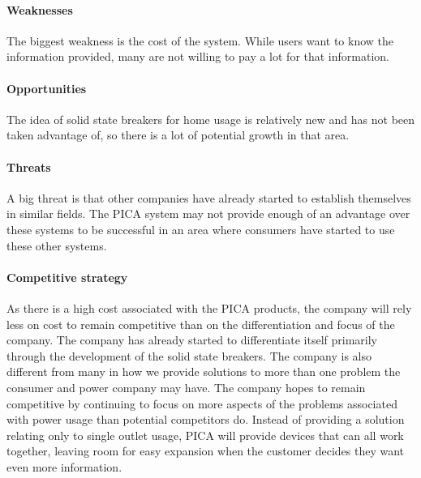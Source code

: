 \paragraph{Weaknesses}
The biggest weakness is the cost of the system. While users want to know the information provided, many are not willing to pay a lot for that information. 
\paragraph{Opportunities}
The idea of solid state breakers for home usage is relatively new and has not been taken advantage of, so there is a lot of potential growth in that area.
\paragraph{Threats}
A big threat is that other companies have already started to establish themselves in similar fields. The PICA system may not provide enough of an advantage over these systems to be successful in an area where consumers have started to use these other systems.
\paragraph{Competitive strategy}
As there is a high cost associated with the PICA products, the company will rely less on cost to remain competitive than on the differentiation and focus of the company. 
The company has already started to differentiate itself primarily through the development of the solid state breakers. The company is also different from many in how we provide solutions to more than one problem the consumer and power company may have.
The company hopes to remain competitive by continuing to focus on more aspects of the problems associated with power usage than potential competitors do. Instead of providing a solution relating only to single outlet usage, PICA will provide devices that can all work together, leaving room for easy expansion when the customer decides they want even more information.